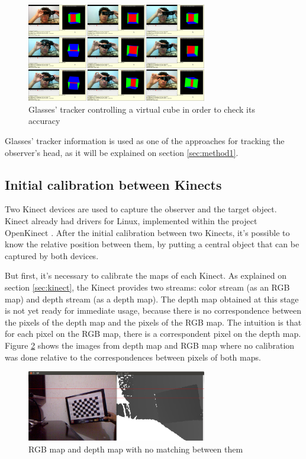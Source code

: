 \documentclass[msc, a4paper, classic, en]{ufbathesis}
\begin{document}
\begin{figure}
\centering
\includegraphics[width=0.7\textwidth]{images/glassescube.png}
\caption{Glasses' tracker controlling a virtual cube in order to check its accuracy}
\label{fig:glassescube}
\end{figure}

Glasses' tracker information is used as one of the approaches for tracking the observer's head, as it will be explained on section \ref{sec:method1}.

\subsection{Initial calibration between Kinects}
\label{sec:kinectscalib}

Two Kinect devices are used to capture the observer and the target object. Kinect already had drivers for Linux, implemented within the project OpenKinect \cite{openkinect}. After the initial calibration between two Kinects, it's possible to know the relative position between them, by putting a central object that can be captured by both devices.

But first, it's necessary to calibrate the maps of each Kinect. As explained on section \ref{sec:kinect}, the Kinect provides two streams: color stream (as an RGB map) and depth stream (as a depth map). The depth map obtained at this stage is not yet ready for immediate usage, because there is no correspondence between the pixels of the depth map and the pixels of the RGB map. The intuition is that for each pixel on the RGB map, there is a correspondent pixel on the depth map. Figure \ref{fig:kinectnotcal} shows the images from depth map and RGB map where no calibration was done relative to the correspondences between pixels of both maps.

\begin{figure}
\centering
\includegraphics[width=0.7\textwidth]{images/kinectnocal.png}
\caption{RGB map and depth map with no matching between them}
\label{fig:kinectnotcal}
\end{figure}
\end{document}
